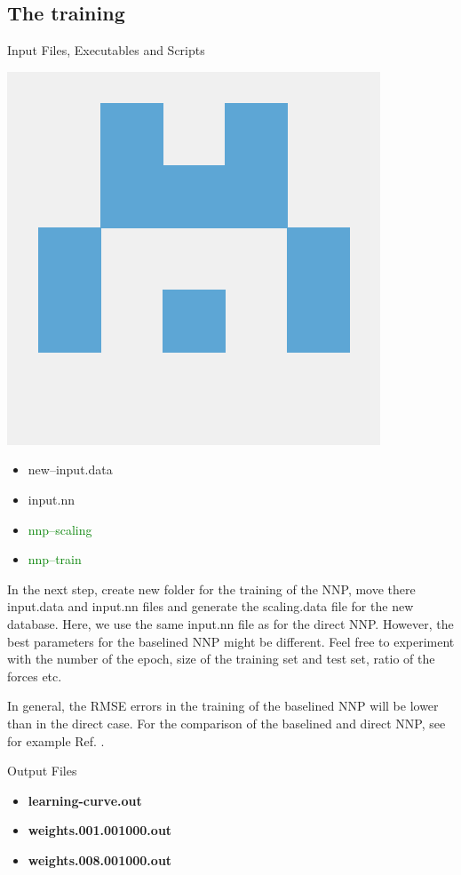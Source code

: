\documentclass[12pt]{article}
\begin{document}
\subsection{The training}
\begin{mybox2}{{Input Files, Executables and Scripts}}
\begin{minipage}[c]{0.5\linewidth}
\includegraphics[scale=0.1]{latex_files/n2p2.png}
\end{minipage}
\begin{minipage}[c]{0.5\linewidth}
\begin{itemize}
    \item new--input.data
    \item input.nn
    \item \textcolor{green}{nnp--scaling}
    \item \textcolor{green}{nnp--train}
\end{itemize}
\end{minipage}
\end{mybox2}

In the next step, create new folder for the training of the NNP, move there input.data and input.nn files and generate the scaling.data file for the new database. Here, we use the same input.nn file as for the direct NNP. However, the best parameters for the baselined NNP might be different. Feel free to experiment with the number of the epoch, size of the training set and test set, ratio of the forces etc.  

In general, the RMSE errors in the training of the baselined NNP will be lower than in the direct case. For the comparison of the baselined and direct NNP, see for example Ref. .
\begin{mybox3}{Output Files}
\begin{itemize}
    \item \textbf{learning-curve.out}
    \item \textbf{weights.001.001000.out}
    \item \textbf{weights.008.001000.out}
\end{itemize}
\end{mybox3}
%
\end{document}
